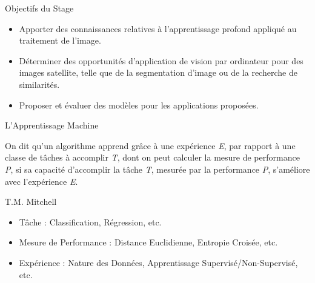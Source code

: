 \documentclass[11pt]{beamer}
\begin{document}
\begin{frame}{Objectifs du Stage}
	\begin{itemize}
		\item Apporter des connaissances relatives à l'apprentissage profond appliqué au traitement de l'image.
		\item Déterminer des opportunités d'application de vision par ordinateur pour des images satellite, telle que de la segmentation d'image ou de la recherche de similarités.
		\item Proposer et évaluer des modèles pour les applications proposées.
	\end{itemize}
\end{frame}
\begin{frame}{L'Apprentissage Machine}
	\begin{displayquote}
		On dit qu'un algorithme apprend grâce à une expérience \emph{E}, par rapport à une classe de tâches à accomplir \emph{T}, dont on peut calculer la mesure de performance \emph{P}, si sa capacité d'accomplir la tâche \emph{T}, mesurée par la performance \emph{P}, s'améliore avec l'expérience \emph{E}.
	\end{displayquote}
	\begin{flushright}
		T.M. Mitchell
	\end{flushright}
	\begin{itemize}
		\item Tâche : Classification, Régression, etc.
		\item Mesure de Performance : Distance Euclidienne, Entropie Croisée, etc.
		\item Expérience : Nature des Données, Apprentissage Supervisé/Non-Supervisé, etc.
	\end{itemize}
\end{frame}
\end{document}
